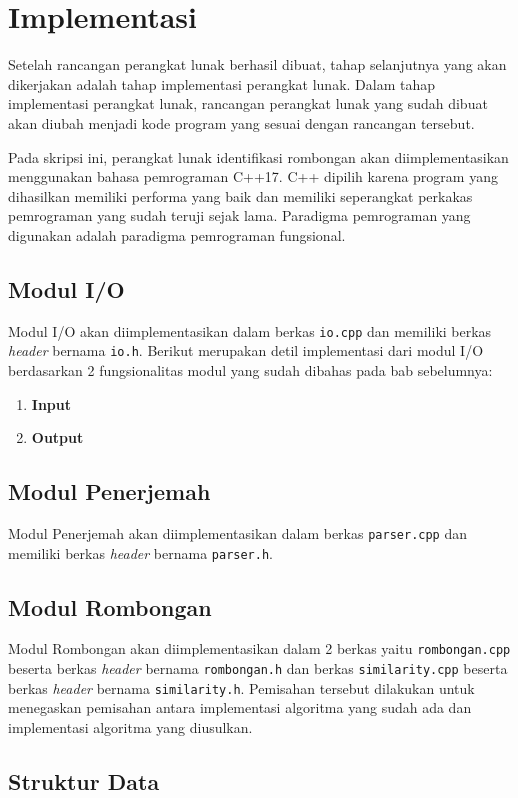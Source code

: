 \chapter{Implementasi}
\label{chap:implementasi}

Setelah rancangan perangkat lunak berhasil dibuat, tahap selanjutnya yang akan dikerjakan adalah tahap implementasi perangkat lunak. Dalam tahap implementasi perangkat lunak, rancangan perangkat lunak yang sudah dibuat akan diubah menjadi kode program yang sesuai dengan rancangan tersebut.

Pada skripsi ini, perangkat lunak identifikasi rombongan akan diimplementasikan menggunakan bahasa pemrograman C++17. C++ dipilih karena program yang dihasilkan memiliki performa yang baik dan memiliki seperangkat perkakas pemrograman yang sudah teruji sejak lama. Paradigma pemrograman yang digunakan adalah paradigma pemrograman fungsional.

\section{Modul I/O}
\label{sec:impl-io}

Modul I/O akan diimplementasikan dalam berkas \texttt{io.cpp} dan memiliki berkas \textit{header} bernama \texttt{io.h}. Berikut merupakan detil implementasi dari modul I/O berdasarkan 2 fungsionalitas modul yang sudah dibahas pada bab sebelumnya:

\begin{enumerate}
    \item \textbf{Input}
    
    \item \textbf{Output}
\end{enumerate}

\section{Modul Penerjemah}
\label{sec:impl-parser}

Modul Penerjemah akan diimplementasikan dalam berkas \texttt{parser.cpp} dan memiliki berkas \textit{header} bernama \texttt{parser.h}. 

\section{Modul Rombongan}
\label{sec:impl-rombongan}

Modul Rombongan akan diimplementasikan dalam 2 berkas yaitu \texttt{rombongan.cpp} beserta berkas \textit{header} bernama \texttt{rombongan.h} dan berkas \texttt{similarity.cpp} beserta berkas \textit{header} bernama \texttt{similarity.h}. Pemisahan tersebut dilakukan untuk menegaskan pemisahan antara implementasi algoritma yang sudah ada dan implementasi algoritma yang diusulkan.

\section{Struktur Data}
\label{sec:impl-struct}